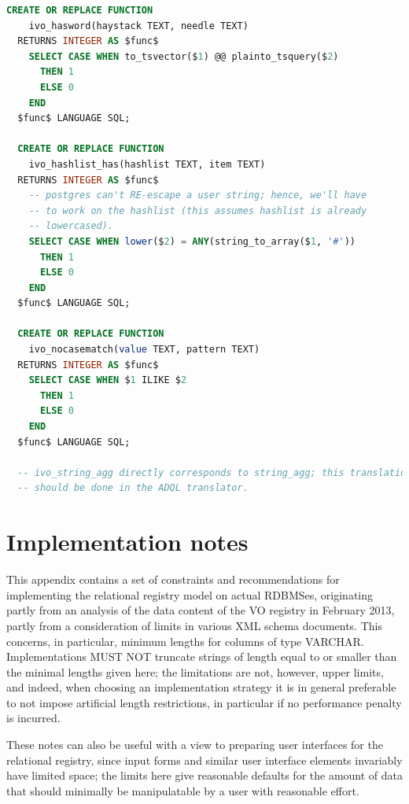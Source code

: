 \documentclass[11pt,a4paper]{ivoa}
\begin{document}
\begin{lstlisting}[language=SQL,flexiblecolumns=true,basicstyle=\footnotesize]
  CREATE OR REPLACE FUNCTION 
    ivo_hasword(haystack TEXT, needle TEXT)
  RETURNS INTEGER AS $func$
    SELECT CASE WHEN to_tsvector($1) @@ plainto_tsquery($2) 
      THEN 1 
      ELSE 0 
    END
  $func$ LANGUAGE SQL;

  CREATE OR REPLACE FUNCTION 
    ivo_hashlist_has(hashlist TEXT, item TEXT)
  RETURNS INTEGER AS $func$
    -- postgres can't RE-escape a user string; hence, we'll have
    -- to work on the hashlist (this assumes hashlist is already
    -- lowercased).
    SELECT CASE WHEN lower($2) = ANY(string_to_array($1, '#'))
      THEN 1 
      ELSE 0 
    END
  $func$ LANGUAGE SQL;

  CREATE OR REPLACE FUNCTION 
    ivo_nocasematch(value TEXT, pattern TEXT)
  RETURNS INTEGER AS $func$
    SELECT CASE WHEN $1 ILIKE $2
      THEN 1 
      ELSE 0 
    END
  $func$ LANGUAGE SQL;

  -- ivo_string_agg directly corresponds to string_agg; this translation
  -- should be done in the ADQL translator.
\end{lstlisting}



\section{Implementation notes}

\label{appBP}

This appendix contains a set of constraints and recommendations for
implementing the relational registry model on actual RDBMSes, originating
partly from an analysis of the data content of the VO registry in February
2013, partly from a consideration of limits in various XML schema documents.
This concerns, in particular, minimum lengths for columns of type
VARCHAR.  Implementations MUST NOT truncate strings of length equal
to or smaller than the minimal lengths given here; the limitations are
not, however, upper limits, and indeed, when choosing an implementation
strategy it is in general preferable to not impose artificial length
restrictions, in particular if no performance penalty is incurred.

These notes can also be useful with a view to preparing user interfaces for
the relational registry, since input forms and similar user interface
elements invariably have limited space; the limits here give reasonable
defaults for the amount of data that should minimally be manipulatable
by a user with reasonable effort.
\end{document}
